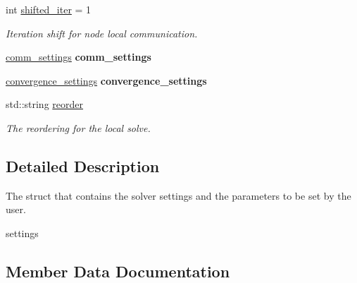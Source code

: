 \begin{DoxyCompactItemize}
\mbox{\label{structSchwarzWrappers_1_1Settings_ac6c824118e57cdcd238cb3aa51d9eef2}} 
int \hyperlink{structSchwarzWrappers_1_1Settings_ac6c824118e57cdcd238cb3aa51d9eef2}{shifted\+\_\+iter} = 1
\begin{DoxyCompactList}\small\item\em Iteration shift for node local communication. \end{DoxyCompactList}\item 
\mbox{\label{structSchwarzWrappers_1_1Settings_ae1249cc74cfee69b680a32ab4a7f19dd}} 
\hyperlink{structSchwarzWrappers_1_1Settings_1_1comm__settings}{comm\+\_\+settings} {\bfseries comm\+\_\+settings}
\item 
\mbox{\label{structSchwarzWrappers_1_1Settings_ac33419832f34b51869eaaac7422cfce8}} 
\hyperlink{structSchwarzWrappers_1_1Settings_1_1convergence__settings}{convergence\+\_\+settings} {\bfseries convergence\+\_\+settings}
\item 
\mbox{\label{structSchwarzWrappers_1_1Settings_aad5c51cd5a726e41c008229886ee61b9}} 
std\+::string \hyperlink{structSchwarzWrappers_1_1Settings_aad5c51cd5a726e41c008229886ee61b9}{reorder}
\begin{DoxyCompactList}\small\item\em The reordering for the local solve. \end{DoxyCompactList}\end{DoxyCompactItemize}


\subsection{Detailed Description}
The struct that contains the solver settings and the parameters to be set by the user. 

settings 

\subsection{Member Data Documentation}
\mbox{\label{structSchwarzWrappers_1_1Settings_a120b05467ef07d770948ccacf12bb1c3}} 
